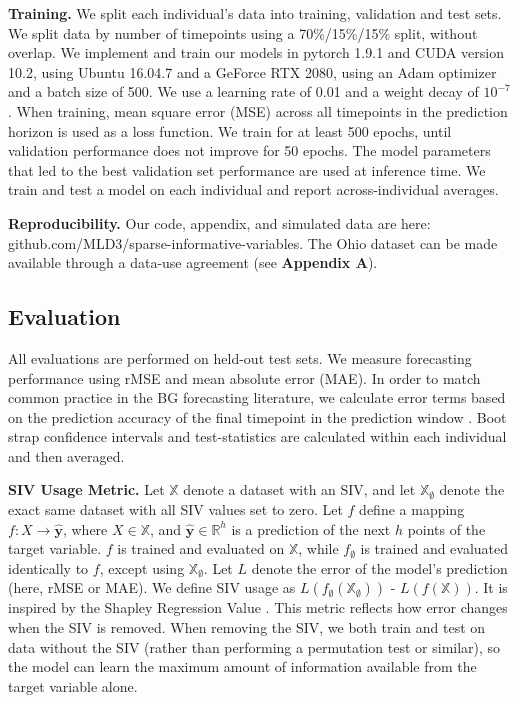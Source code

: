 \documentclass[letterpaper]{article}
\begin{document}
\textbf{Training.} We split each individual's data into training, validation and test sets. We split data by number of timepoints using a 70\%/15\%/15\% split, without overlap. We implement and train our models in pytorch 1.9.1 and CUDA version 10.2, using Ubuntu 16.04.7 and a GeForce RTX 2080, using an Adam optimizer \cite{kn:adam} and a batch size of 500. We use a learning rate of 0.01 and a weight decay of $10^{-7}$. When training, mean square error (MSE) across all timepoints in the prediction horizon is used as a loss function. We train for at least 500 epochs, until validation performance does not improve for 50 epochs. The model parameters that led to the best validation set performance are used at inference time. We train and test a model on each individual and report across-individual averages.

\textbf{Reproducibility.} Our code, appendix, and simulated data are here: github.com/MLD3/sparse-informative-variables. The Ohio dataset can be made available through a data-use agreement (see \textbf{Appendix A}).


\subsection{Evaluation}

All evaluations are performed on held-out test sets. We measure forecasting performance using rMSE and mean absolute error (MAE). In order to match common practice in the BG forecasting literature, we calculate error terms based on the prediction accuracy of the final timepoint in the prediction window \cite{kn:oc}. Boot strap confidence intervals and test-statistics are calculated within each individual and then averaged.

\textbf{SIV Usage Metric.} Let $\mathbb{X}$ denote a dataset with an SIV, and let $\mathbb{X_\emptyset}$ denote the exact same dataset with all SIV values set to zero. Let $f$ define a mapping $f:X\rightarrow \mathbf{\hat{y}}$, where $X \in \mathbb{X}$, and $\mathbf{\hat{y}} \in \mathbb{R}^h$ is a prediction of the next $h$ points of the target variable. $f$ is trained and evaluated on $\mathbb{X}$, while $f_\emptyset$ is trained and evaluated identically to $f$, except using $\mathbb{X_\emptyset}$. Let $L$ denote the error of the model's prediction (here, rMSE or MAE). We define SIV usage as $L(f_\emptyset(\mathbb{X_\emptyset}))$ - $L(f(\mathbb{X}))$. It is inspired by the Shapley Regression Value \cite{shap}. This metric reflects how error changes when the SIV is removed. When removing the SIV, we both train and test on data without the SIV (rather than performing a permutation test or similar), so the model can learn the maximum amount of information available from the target variable alone.
\end{document}
